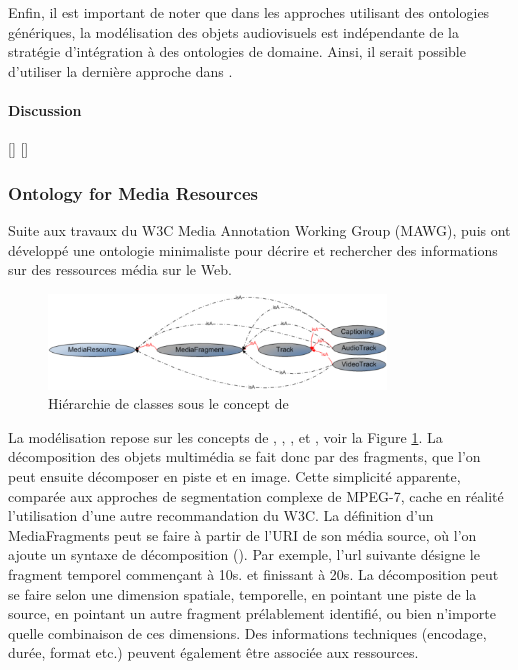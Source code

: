 Enfin, il est important de noter que dans les approches utilisant des ontologies génériques, la modélisation des objets audiovisuels est indépendante de la stratégie d'intégration à des ontologies de domaine. 
Ainsi, il serait possible d'utiliser la dernière approche dans .

\paragraph{Discussion}
[]
[]




\subsubsection{Ontology for Media Resources}\label{sec:omr}
Suite aux travaux du W3C Media Annotation Working Group (MAWG), \cite{Burger2011} puis \cite{Lee2012} ont développé une ontologie minimaliste pour décrire et rechercher des informations sur des ressources média sur le Web.

\begin{figure}[ht!]
\centering
\includegraphics[width=0.8\textwidth]{images/MA-model.png}
\caption{Hiérarchie de classes sous le concept de }
\label{img:ma-model}
\end{figure}

La modélisation repose sur les concepts de , , ,  et , voir la Figure \ref{img:ma-model}.
La décomposition des objets multimédia se fait donc par des fragments, que l'on peut ensuite décomposer en piste et en image.
Cette simplicité apparente, comparée aux approches de segmentation complexe de MPEG-7, cache en réalité l'utilisation d'une autre recommandation du W3C.
La définition d'un MediaFragments peut se faire à partir de l'URI de son média source, où l'on ajoute un syntaxe de décomposition (\cite{Hausenblas2011}).
Par exemple, l'url suivante  désigne le fragment temporel commençant à 10s. et finissant à 20s.
La décomposition peut se faire selon une dimension spatiale, temporelle, en pointant une piste de la source, en pointant un autre fragment prélablement identifié, ou bien n'importe quelle combinaison de ces dimensions.
Des informations techniques (encodage, durée, format etc.) peuvent également être associée aux ressources.

